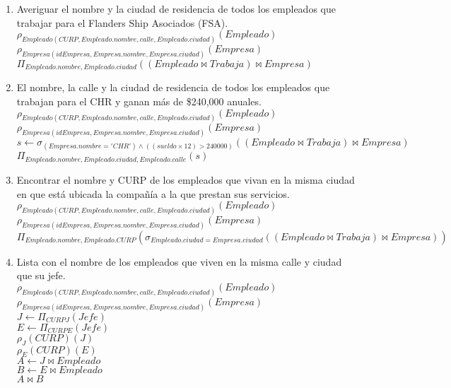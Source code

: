 \documentclass{article}
\begin{document}
\begin{enumerate}
\begin{enumerate}
				\item Averiguar el nombre y la ciudad de residencia de todos los empleados que trabajar para el
				Flanders Ship Asociados (FSA).\\
				
				$\rho_{Empleado(CURP, Empleado.nombre, calle, Empleado.ciudad)}(Empleado)$\\
				$\rho_{Empresa(idEmpresa, Empresa.nombre, Empresa.ciudad)}(Empresa)$\\
				$\Pi_{Empleado.nombre, Empleado.ciudad}((Empleado \bowtie Trabaja) \bowtie Empresa)$\\
				
				\item El nombre, la calle y la ciudad de residencia de todos los empleados que trabajan para el CHR
				y ganan más de \$240,000 anuales.\\
				
				$\rho_{Empleado(CURP, Empleado.nombre, calle, Empleado.ciudad)}(Empleado)$\\
				$\rho_{Empresa(idEmpresa, Empresa.nombre, Empresa.ciudad)}(Empresa)$\\
				$s \leftarrow \sigma_{(Empresa.nombre = 'CHR') \land ((sueldo \times 12) > 240 000)}((Empleado \bowtie Trabaja) \bowtie Empresa)$\\
				$\Pi_{Empleado.nombre, Empleado.ciudad, Empleado.calle}(s)$\\
				
				\item Encontrar el nombre y CURP de los empleados que vivan en la misma ciudad en que está
				ubicada la compañía a la que prestan sus servicios.\\
				
				$\rho_{Empleado(CURP, Empleado.nombre, calle, Empleado.ciudad)}(Empleado)$\\
				$\rho_{Empresa(idEmpresa, Empresa.nombre, Empresa.ciudad)}(Empresa)$\\
				$\Pi_{Empleado.nombre, Empleado.CURP}(\sigma_{Empleado.ciudad = Empresa.ciudad}((Empleado \bowtie Trabaja) \bowtie Empresa))$\\
				
				\item Lista con el nombre de los empleados que viven en la misma calle y ciudad que su jefe.\\
				
				$\rho_{Empleado(CURP, Empleado.nombre, calle, Empleado.ciudad)}(Empleado)$\\
				$\rho_{Empresa(idEmpresa, Empresa.nombre, Empresa.ciudad)}(Empresa)$\\
				$J \leftarrow \Pi_{CURPJ}(Jefe)$\\
				$E \leftarrow \Pi_{CURPE}(Jefe)$\\
				$\rho_{J}(CURP)(J)$\\
				$\rho_{E}(CURP)(E)$\\
				$A \leftarrow J \bowtie Empleado$\\			
				$B \leftarrow E \bowtie Empleado$\\
				$A \bowtie B$\\
				

\end{enumerate}
\end{enumerate}
\end{document}
